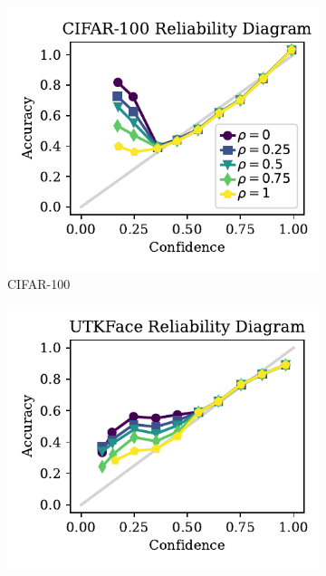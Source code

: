 \begin{figure}[t]
\centering

\begin{subfigure}[b]{0.24\textwidth}
  \centering
  \includegraphics[width=\linewidth]{figs/confidential_guardian/cifar100_ref_abl.pdf}
  \caption{CIFAR-100}
\end{subfigure}
\hfill
\begin{subfigure}[b]{0.24\textwidth}
  \centering
  \includegraphics[width=\linewidth]{figs/confidential_guardian/utkface_ref_abl.pdf}

\end{subfigure}
\end{figure}
